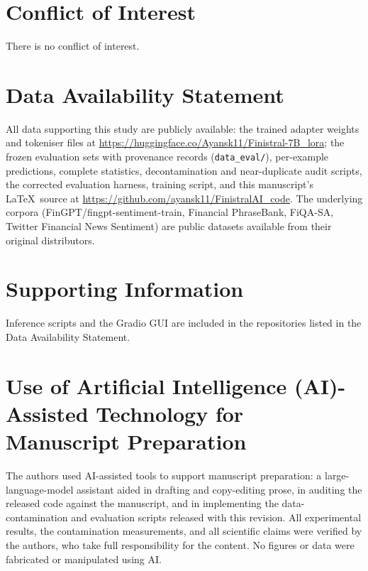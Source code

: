 \documentclass[a4paper]{article}
\begin{document}
\section*{Conflict of Interest}

There is no conflict of interest.

\section*{Data Availability Statement}

All data supporting this study are publicly available: the trained adapter weights and tokeniser files at \url{https://huggingface.co/Ayansk11/Finistral-7B_lora}; the frozen evaluation sets with provenance records (\texttt{data\_eval/}), per-example predictions, complete statistics, decontamination and near-duplicate audit scripts, the corrected evaluation harness, training script, and this manuscript's \LaTeX\ source at \url{https://github.com/ayansk11/FinistralAI_code}. The underlying corpora (FinGPT/fingpt-sentiment-train, Financial PhraseBank, FiQA-SA, Twitter Financial News Sentiment) are public datasets available from their original distributors.

\section*{Supporting Information}

Inference scripts and the Gradio GUI are included in the repositories listed in the Data Availability Statement.

\section*{Use of Artificial Intelligence (AI)-Assisted Technology for Manuscript Preparation}

The authors used AI-assisted tools to support manuscript preparation: a large-language-model assistant aided in drafting and copy-editing prose, in auditing the released code against the manuscript, and in implementing the data-contamination and evaluation scripts released with this revision. All experimental results, the contamination measurements, and all scientific claims were verified by the authors, who take full responsibility for the content. No figures or data were fabricated or manipulated using AI.


\end{document}
